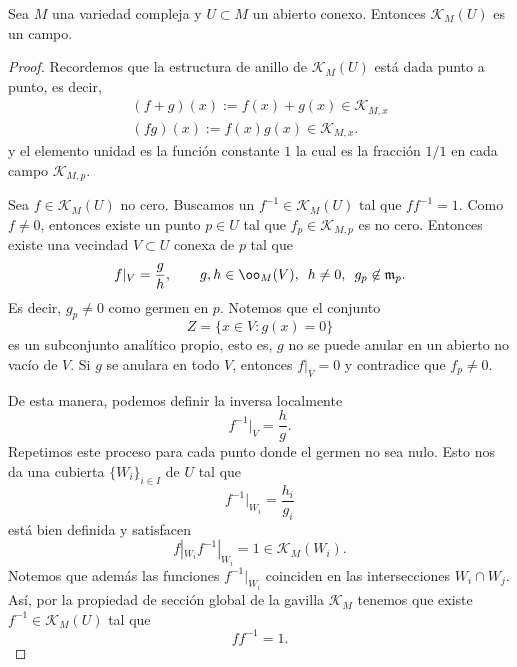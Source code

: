 \begin{propo}\label{campodefunciones}
	Sea $M$ una variedad compleja y $U\subset M$ un abierto conexo. Entonces $\mathcal{K}_{M}(U)$ es un campo.
\end{propo}
\begin{proof}
	Recordemos que la estructura de anillo de $\mathcal{K}_{M}(U)$ está dada punto a punto, es decir,
	\begin{align*}
		(f+g)(x):=f(x)+g(x)\in\mathcal{K}_{M,x}\\
		(fg)(x):=f(x)g(x)\in\mathcal{K}_{M,x}.
	\end{align*}
	y el elemento unidad es la función constante $1$ la cual es la fracción $1/1$ en cada campo $\mathcal{K}_{M,p}$.
	
	Sea $f\in \mathcal{K}_{M}(U)$ no cero. Buscamos un $f^{-1}\in\mathcal{K}_{M}(U)$ tal que $ff^{-1}=1$.
	Como $f\neq 0$, entonces existe un punto $p\in U$ tal que $f_p\in\mathcal{K}_{M,p}$ es no cero. Entonces existe una vecindad $V\subset U$ conexa de $p$ tal que
	\begin{equation*}
		f|_V=\frac gh,\qquad g,h\in\oo_M(V),\enspace h\neq 0,\enspace g_p\not\in\mathfrak{m}_p.
	\end{equation*}
	Es decir, $g_p\neq 0$ como germen en $p$. Notemos que el conjunto 
	\begin{equation*}
		Z=\{x\in V:g(x)=0\}
	\end{equation*}
	es un subconjunto analítico propio, esto es, $g$ no se puede anular en un abierto no vacío de $V$. Si $g$ se anulara en todo $V$, entonces $f|_V=0$ y contradice que $f_p\neq 0$.
	
	De esta manera, podemos definir la inversa localmente 
	\begin{equation*}
		f^{-1}|_V=\frac hg.
	\end{equation*} 
	Repetimos este proceso para cada punto donde el germen no sea nulo. Esto nos da una cubierta $\{W_i\}_{i\in I}$ de $U$ tal que
	\begin{equation*}
		f^{-1}|_{W_i}=\frac{h_i}{g_i}
	\end{equation*}
	está bien definida y satisfacen 
	\begin{equation*}
		f|_{W_i}f^{-1}|_{W_i}=1\in\mathcal{K}_M(W_i).
	\end{equation*}
	Notemos que además las funciones $f^{-1}|_{W_i}$ coinciden en las intersecciones $W_i\cap W_j$. Así, por la propiedad de sección global de la gavilla $\mathcal{K}_M$ tenemos que existe $f^{-1}\in \mathcal{K}_{M}(U)$ tal que
	\begin{equation*}
		ff^{-1}=1.
	\end{equation*}
\end{proof}

